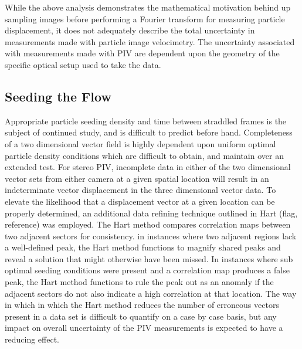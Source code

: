 

While the above analysis demonstrates the mathematical motivation behind up 
sampling images before performing a Fourier transform for measuring particle 
displacement, it does not adequately describe the total uncertainty in 
measurements made with particle image velocimetry. The uncertainty associated 
with measurements made with PIV are dependent upon the geometry of the specific 
optical setup used to take the data.


\subsection{Seeding the Flow}

Appropriate particle seeding density and time between straddled frames is the
subject of continued study, and is difficult to predict before hand. 
Completeness of a two dimensional vector field is highly dependent upon 
uniform
optimal particle density conditions which are difficult to obtain, and maintain
over an extended test. For stereo PIV, incomplete data in either of the two 
dimensional vector 
sets from either camera at a given spatial location will result in an 
indeterminate vector displacement in the three dimensional vector data. To 
elevate the likelihood that a displacement vector at a given location can be 
properly determined, an additional data refining technique outlined in Hart 
(flag, reference) was employed. The Hart method compares correlation maps 
between two adjacent sectors for consistency. in instances where two adjacent 
regions lack a well-defined peak, the Hart method functions to magnify shared 
peaks and reveal a solution that might otherwise have been missed. In instances 
where sub optimal seeding conditions were present and a correlation map 
produces a false peak, the Hart method functions to rule the peak out as an 
anomaly if the adjacent sectors do not also indicate a high correlation at that 
location. The way in which in which the Hart method reduces the number of 
erroneous vectors present in a data set is difficult to quantify on a case by 
case basis, but any impact on overall uncertainty of the PIV measurements is 
expected to have a reducing effect. 